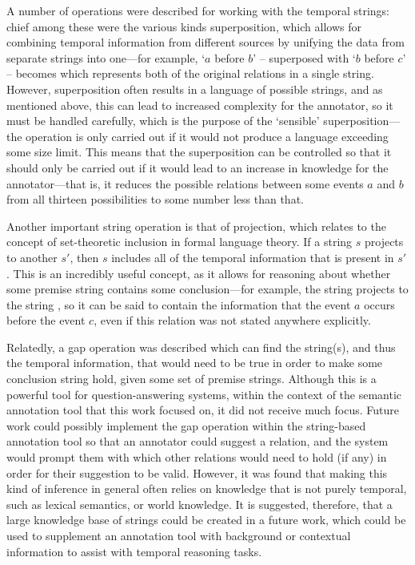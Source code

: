 \documentclass[a4paper,12pt,leqno]{article}
\newcommand{\vph}[1]{\vphantom{#1}}
\newcommand{\ebox}[1]{\fbox{$\vph{'(),}#1$}}
\newcommand{\nbBefore}[2]{\ebox{#1}\ebox{}\ebox{#2}}
\newcommand{\Before}[2]{\ebox{}\nbBefore{#1}{#2}\ebox{}}
\newcommand{\cBefore}[2]{`$#1$  before $#2$' -- \Before{#1}{#2}}
\newcommand{\EventString}[1]{%
	\renewcommand*{\do}[1]{\ebox{##1}}%
	\PipeParser{#1}%
}
\begin{document}
A number of operations were described for working with the temporal strings: chief among these were the various kinds superposition, which allows for combining temporal information from different sources by unifying the data from separate strings into one---for example, \cBefore{a}{b} superposed with \cBefore{b}{c} becomes \EventString{{}|a|{}|b|{}|c|{}} which represents both of the original relations in a single string. However, superposition often results in a language of possible strings, and as mentioned above, this can lead to increased complexity for the annotator, so it must be handled carefully, which is the purpose of the `sensible' superposition---the operation is only carried out if it would not produce a language exceeding some size limit. This means that the superposition can be controlled so that it should only be carried out if it would lead to an increase in knowledge for the annotator---that is, it reduces the possible relations between some events $a$ and $b$ from all thirteen possibilities to some number less than that.

Another important string operation is that of projection, which relates to the concept of set-theoretic inclusion in formal language theory. If a string $s$ projects to another $s'$, then $s$ includes all of the temporal information that is present in $s'$. This is an incredibly useful concept, as it allows for reasoning about whether some premise string contains some conclusion---for example, the string \EventString{{}|a|{}|b|{}|c|{}} projects to the string \Before{a}{c}, so it can be said to contain the information that the event $a$ occurs before the event $c$, even if this relation was not stated anywhere explicitly.

Relatedly, a gap operation was described which can find the string(s), and thus the temporal information, that would need to be true in order to make some conclusion string hold, given some set of premise strings. Although this is a powerful tool for question-answering systems, within the context of the semantic annotation tool that this work focused on, it did not receive much focus. Future work could possibly implement the gap operation within the string-based annotation tool so that an annotator could suggest a relation, and the system would prompt them with which other relations would need to hold (if any) in order for their suggestion to be valid. However, it was found that making this kind of inference in general often relies on knowledge that is not purely temporal, such as lexical semantics, or world knowledge. It is suggested, therefore, that a large knowledge base of strings could be created in a future work, which could be used to supplement an annotation tool with background or contextual information to assist with temporal reasoning tasks.
\end{document}
